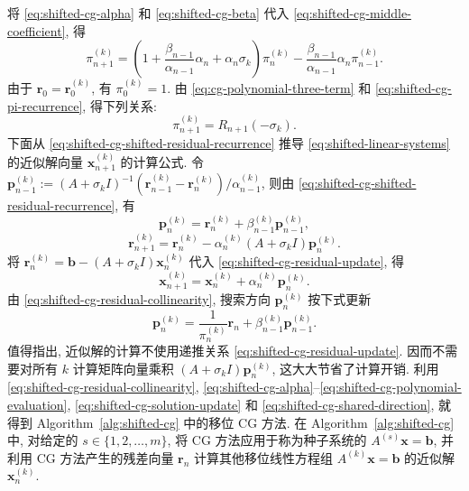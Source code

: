 {将 \eqref{eq:shifted-cg-alpha} 和 \eqref{eq:shifted-cg-beta} 代入 \eqref{eq:shifted-cg-middle-coefficient}, 得}
\begin{equation}\label{eq:shifted-cg-pi-recurrence}\pi_{n+1}^{(k)}=\left(1+\frac{\beta_{n-1}}{\alpha_{n-1}}\alpha_n+\alpha_n\sigma_k\right)\pi_n^{(k)}-\frac{\beta_{n-1}}{\alpha_{n-1}}\alpha_n\pi_{n-1}^{(k)}.\end{equation}
{由于 $\bm r_0=\bm r_0^{(k)}$, 有 $\pi_0^{(k)}=1$. 由 \eqref{eq:cg-polynomial-three-term} 和 \eqref{eq:shifted-cg-pi-recurrence}, 得下列关系:}
\begin{equation}\label{eq:shifted-cg-polynomial-evaluation}\pi_{n+1}^{(k)}=R_{n+1}(-\sigma_k).\end{equation}
{下面从 \eqref{eq:shifted-cg-shifted-residual-recurrence} 推导 \eqref{eq:shifted-linear-systems} 的近似解向量 $\bm x_{n+1}^{(k)}$ 的计算公式. 令 $\bm p_{n-1}^{(k)}:=(A+\sigma_k I)^{-1}(\bm r_{n-1}^{(k)}-\bm r_n^{(k)})/\alpha_{n-1}^{(k)}$, 则由 \eqref{eq:shifted-cg-shifted-residual-recurrence}, 有}
\begin{equation}\label{eq:shifted-cg-direction-recurrence}\bm p_n^{(k)}=\bm r_n^{(k)}+\beta_{n-1}^{(k)}\bm p_{n-1}^{(k)},\end{equation}
\begin{equation}\label{eq:shifted-cg-residual-update}\bm r_{n+1}^{(k)}=\bm r_n^{(k)}-\alpha_n^{(k)}(A+\sigma_k I)\bm p_n^{(k)}.\end{equation}
{将 $\bm r_n^{(k)}=\bm b-(A+\sigma_k I)\bm x_n^{(k)}$ 代入 \eqref{eq:shifted-cg-residual-update}, 得}
\begin{equation}\label{eq:shifted-cg-solution-update}\bm x_{n+1}^{(k)}=\bm x_n^{(k)}+\alpha_n^{(k)}\bm p_n^{(k)}.\end{equation}
{由 \eqref{eq:shifted-cg-residual-collinearity}, 搜索方向 $\bm p_n^{(k)}$ 按下式更新}
\begin{equation}\label{eq:shifted-cg-shared-direction}\bm p_n^{(k)}=\frac1{\pi_n^{(k)}}\bm r_n+\beta_{n-1}^{(k)}\bm p_{n-1}^{(k)}.\end{equation}
{\leavevmode{}\label{idx:chapter-04-section-02:shifted-cg-cost-and-seed}值得指出, 近似解的计算不使用递推关系 \eqref{eq:shifted-cg-residual-update}. 因而不需要对所有 $k$ 计算矩阵向量乘积 $(A+\sigma_k I)\bm p_n^{(k)}$, 这大大节省了计算开销.}
{利用 \eqref{eq:shifted-cg-residual-collinearity}, \eqref{eq:shifted-cg-alpha}--\eqref{eq:shifted-cg-polynomial-evaluation}, \eqref{eq:shifted-cg-solution-update} 和 \eqref{eq:shifted-cg-shared-direction}, 就得到 Algorithm\ \ref{alg:shifted-cg} 中的移位 CG 方法. 在 Algorithm\ \ref{alg:shifted-cg} 中, 对给定的 $s\in\{1,2,\ldots,m\}$, 将 CG 方法应用于称为种子系统的 $A^{(s)}\bm x=\bm b$, 并利用 CG 方法产生的残差向量 $\bm r_n$ 计算其他移位线性方程组 $A^{(k)}\bm x=\bm b$ 的近似解 $\bm x_n^{(k)}$.}
